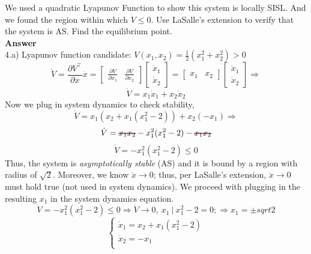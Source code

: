 \documentclass{homeworg}
\newcommand\hcancel[2][black]{\setbox0=\hbox{$#2$}%
\rlap{\raisebox{.45\ht0}{\textcolor{#1}{\rule{\wd0}{1pt}}}}#2}
\begin{document}
We used a quadratic Lyapunov Function to show this system is locally SISL.
And we found the region within which \(\dot{V} \leq 0\).
Use LaSalle’s extension to verify that the system is AS. Find the
equilibrium point.\\
\noindent
\textbf{Answer} \\
4.a) Lyapunov function candidate: \( V(x_1, x_2) = \frac{1}{2} (x_1^2 + x_2^2) > 0\)
\begin{equation*}
\dot{V} = \frac{\partial V^\top}{\partial x} \dot{x} =
\begin{bmatrix}
\frac{\partial V}{\partial x_1} & \frac{\partial V}{\partial x_2}
\end{bmatrix}
\begin{bmatrix}
\dot{x}_1 \\
\dot{x}_2
\end{bmatrix}
=
\begin{bmatrix}
  x_1 & x_2
  \end{bmatrix}
  \begin{bmatrix}
  \dot{x}_1 \\
  \dot{x}_2
  \end{bmatrix}
  \Rightarrow
\end{equation*}
\begin{equation*}
\dot{V} =
  x_1 \dot{x}_1 + x_2 \dot{x}_2
\end{equation*}
Now we plug in system dynamics to check stability,
\begin{equation*}
  \dot{V} = x_1 (x_2 + x_1 (x_1^2 -2)) + x_2(-x_1) \Rightarrow
\end{equation*}
\begin{equation*}
  \dot{V} = \hcancel[red]{x_1 x_2} - x_1^2(x_1^2 -2) - \hcancel[red]{x_1 x_2}
\end{equation*}
\begin{equation*}
  \dot{V} = - x_1^2(x_1^2 -2) \leq 0
\end{equation*}
Thus, the system is \emph{asymptotically stable} (AS) and it is bound by a region
with radius of \(\sqrt{2}\). Moreover, we know \(\dot{x} \rightarrow 0\); thus,
per LaSalle’s extension, \(\ddot{x} \rightarrow 0\) must hold true (not used in
system dynamics). We proceed with plugging in the resulting \(x_1\) in the
system dynamics equation.
\begin{equation*}
  \dot{V} = - x_1^2(x_1^2 -2) \leq 0 \Rightarrow \dot{V} \rightarrow 0,~x_1~|~x_{1}^{2} - 2 = 0; \Rightarrow x_1 = \pm sqrt{2}
\end{equation*}
\begin{equation*}
  \begin{cases}
    \dot{x}_1 = x_2 + x_1 (x_1^2 -2 )\\
    \dot{x}_2 = -x_1\\
  \end{cases}
\end{equation*}
\end{document}

